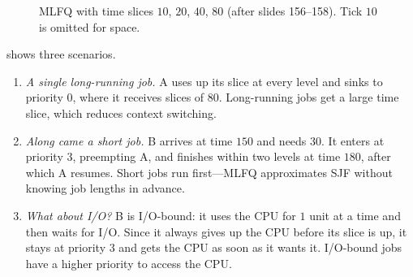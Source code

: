 \begin{figure}[htbp]
\centering
\newcommand{\prows}{%
  \node[anchor=east, font=\scriptsize, color=initc] at ($(0,3)+(-1.5mm,0)$) {Priority 3};
  \node[anchor=east, font=\scriptsize, color=orange] at ($(0,2)+(-1.5mm,0)$) {Priority 2};
  \node[anchor=east, font=\scriptsize, color=tskedge] at ($(0,1)+(-1.5mm,0)$) {Priority 1};
  \node[anchor=east, font=\scriptsize, color=parentc] at ($(0,0)+(-1.5mm,0)$) {Priority 0};}

\vspace{3mm}

\vspace{3mm}
\caption{MLFQ with time slices $10$, $20$, $40$, $80$ (after slides 156--158). Tick $10$ is omitted for space.}
\label{fig:mlfq}
\end{figure}

\begin{example}
  \label{ex:mlfq}
   shows three scenarios.
  \begin{enumerate}
    \item \emph{A single long-running job.} A uses up its slice at every level and sinks to priority $0$, where it receives slices of $80$. Long-running jobs get a large time slice, which reduces context switching.
    \item \emph{Along came a short job.} B arrives at time $150$ and needs $30$. It enters at priority $3$, preempting A, and finishes within two levels at time $180$, after which A resumes. Short jobs run first---MLFQ approximates SJF without knowing job lengths in advance.
    \item \emph{What about I/O?} B is I/O-bound: it uses the CPU for $1$ unit at a time and then waits for I/O. Since it always gives up the CPU before its slice is up, it stays at priority $3$ and gets the CPU as soon as it wants it. I/O-bound jobs have a higher priority to access the CPU.
  \end{enumerate}
\end{example}

